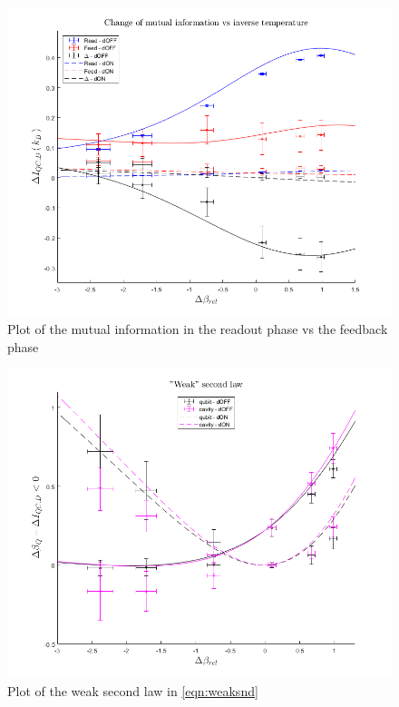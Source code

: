 \documentclass[10pt,a4paper]{report}
\theoremstyle{plain}
\theoremstyle{definition}
\theoremstyle{remark}
\begin{document}
\begin{figure}
  \centering
  \includegraphics[height=0.45\textheight]{plots/Info2.png}
  \caption{Plot of the mutual information in the readout phase vs the feedback
    phase}\label{fig:info2}

\end{figure}

\begin{figure}
  \centering
  \includegraphics[height=0.45\textheight]{plots/Weak2.png}
  \caption{Plot of the weak second law in \cref{eqn:weaksnd}}\label{fig:weak2}
\end{figure}
\end{document}
